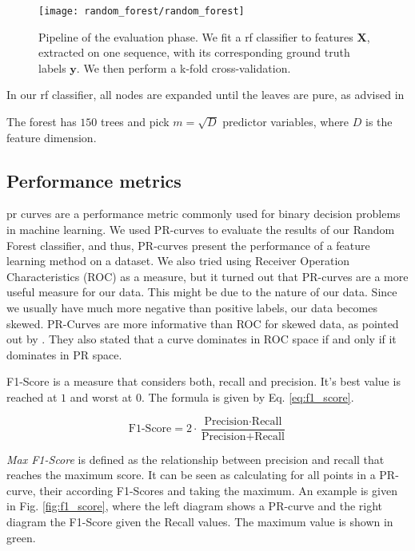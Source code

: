 \begin{figure}[htbp]
  \centering
  \texttt{[image: random\_forest/random\_forest]}
  \caption[Evaluation pipeline]{Pipeline of the evaluation phase. We fit a \gls{rf} classifier to features $\boldsymbol{X}$, extracted on one sequence, with its corresponding ground truth labels $\boldsymbol{y}$.
    We then perform a k-fold cross-validation.}
  \label{fig:random_forest}
\end{figure}

In our \gls{rf} classifier, all nodes are expanded until the leaves are pure, as advised in \cite[pg. 596]{hastie09}

The forest has $150$ trees and pick $m=\sqrt{D}$ predictor variables, where $D$ is the feature dimension.

\subsection{Performance metrics}
\gls{pr} curves are a performance metric commonly used for binary decision problems in machine learning.
We used PR-curves to evaluate the results of our Random Forest classifier, and thus, PR-curves present the performance of a feature learning method on a dataset.
We also tried using Receiver Operation Characteristics (ROC) as a measure, but it turned out that PR-curves are a more useful measure for our data.
This might be due to the nature of our data.
Since we usually have much more negative than positive labels, our data becomes skewed.
PR-Curves are more informative than ROC for skewed data, as pointed out by \cite{davis06}. They also stated that a curve dominates in ROC space if and only if it dominates in PR space.

F1-Score is a measure that considers both, recall and precision. It's best value is reached at $1$ and worst at $0$. The formula is given by Eq. \ref{eq:f1_score}.

\begin{equation}
\textrm{F1-Score} = 2 \cdot \frac{\textrm{Precision} \cdot \textrm{Recall}}{\textrm{Precision} + \textrm{Recall}}
\label{eq:f1_score}
\end{equation}
\hspace{6pt}

\textit{Max F1-Score} is defined as the relationship between precision and recall that reaches the maximum score. It can be seen as calculating for all points in a PR-curve, their according F1-Scores and taking the maximum. An example is given in Fig. \ref{fig:f1_score}, where the left diagram shows a PR-curve and the right diagram the F1-Score given the Recall values. The maximum value is shown in green.


